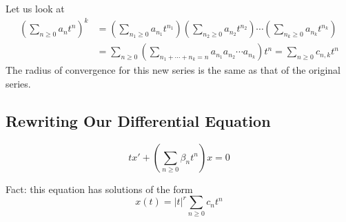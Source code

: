 \documentclass[12pt]{article}
\begin{document}
Let us look at \[ 
\begin{aligned}
\left(\sum_{n\ge0}a_nt^n\right)^k &= \left(\sum_{n_1\ge0}a_{n_1}t^{n_1}\right)\left(\sum_{n_2\ge0}a_{n_2}t^{n_2}\right)\cdots\left(\sum_{n_k\ge0}a_{n_k}t^{n_k}\right) \\
&= \sum_{n\ge 0}\left(\sum_{n_1 + \cdots + n_k = n}a_{n_1}a_{n_2}\cdots a_{n_k}\right)t^n = \sum_{n \ge 0}c_{n,k}t^n
\end{aligned}
\]
The radius of convergence for this new series is the same as that of the original series.

\subsection{Rewriting Our Differential Equation}
\[ tx' + \left(\sum_{n\ge0}\beta_nt^n\right)x = 0 \]

Fact: this equation has solutions of the form \[ x(t) = |t|^r\sum_{n\ge0}c_nt^n \]
\end{document}
